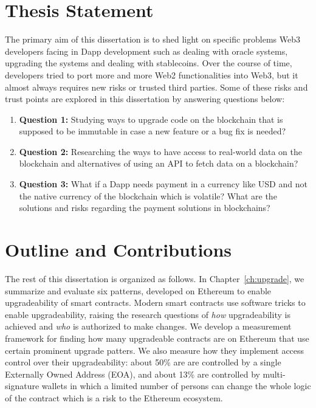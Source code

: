 \section{Thesis Statement}
The primary aim of this dissertation is to shed light on specific problems Web3 developers facing in Dapp development such as dealing with oracle systems, upgrading the systems and dealing with stablecoins. Over the course of time, developers tried to port more and more Web2 functionalities into Web3, but it almost always requires new risks or trusted third parties. Some of these risks and trust points are explored in this dissertation by answering questions below:

\begin{enumerate}
    \item \textbf{Question 1:} Studying ways to upgrade code on the blockchain that is supposed to be immutable in case a new feature or a bug fix is needed?
    \item \textbf{Question 2:} Researching the ways to have access to real-world data on the blockchain and alternatives of using an API to fetch data on a blockchain?
    \item \textbf{Question 3:} What if a Dapp needs payment in a currency like USD and not the native currency of the blockchain which is volatile? What are the solutions and risks regarding the payment solutions in blockchains?
\end{enumerate}


\section{Outline and Contributions}
The rest of this dissertation is organized as follows. In Chapter~\ref{ch:upgrade}, we summarize and evaluate six patterns, developed on Ethereum to enable upgradeability of smart contracts. Modern smart contracts use software tricks to enable upgradeability, raising the research questions of \textit{how} upgradeability is achieved and \textit{who} is authorized to make changes. We develop a measurement framework for finding how many upgradeable contracts are on Ethereum that use certain prominent upgrade patters. We also measure how they implement access control over their upgradeability: about 50\% are are controlled by a single Externally Owned Address (EOA), and about 13\% are controlled by multi-signature wallets in which a limited number of persons can change the whole logic of the contract which is a risk to the Ethereum ecosystem.

